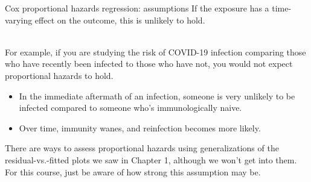 \documentclass[10pt,t]{beamer}
\begin{document}
\begin{frame}{Cox proportional hazards regression: assumptions}
	If the exposure has a time-varying effect on the outcome, this is unlikely to hold. 
	\\ ~\ 
	
	For example, if you are studying the risk of COVID-19 infection comparing those who have recently been infected to those who have not, you would not expect proportional hazards to hold. 
	\begin{itemize}
		\item In the immediate aftermath of an infection, someone is very unlikely to be infected compared to someone who's immunologically naive. 
		\item Over time, immunity wanes, and reinfection becomes more likely. 
	\end{itemize}

	There are ways to assess proportional hazards using generalizations of the residual-vs.-fitted plots we saw in Chapter 1, although we won't get into them. For this course, just be aware of how strong this assumption may be.
\end{frame}
\end{document}
